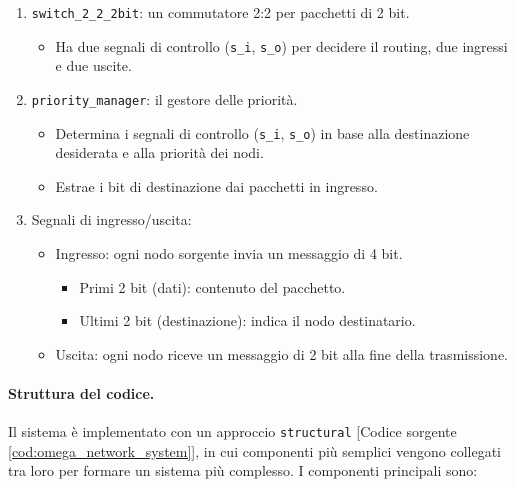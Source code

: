 \begin{enumerate}
\begin{itemize}
\begin{itemize}
        \end{itemize}
    \end{itemize}
    \item \texttt{switch\_2\_2\_2bit}: un commutatore 2:2 per pacchetti di 2 bit.
    \begin{itemize}
        \item Ha due segnali di controllo (\texttt{s\_i}, \texttt{s\_o}) per decidere il routing, due ingressi e due uscite.
    \end{itemize}
    \item \texttt{priority\_manager}: il gestore delle priorità.
    \begin{itemize}
        \item Determina i segnali di controllo (\texttt{s\_i}, \texttt{s\_o}) in base alla destinazione desiderata e alla priorità dei nodi.
        \item Estrae i bit di destinazione dai pacchetti in ingresso.
    \end{itemize}
    \item Segnali di ingresso/uscita:
    \begin{itemize}
        \item Ingresso: ogni nodo sorgente invia un messaggio di 4 bit.
        \begin{itemize}
            \item Primi 2 bit (dati): contenuto del pacchetto.
            \item Ultimi 2 bit (destinazione): indica il nodo destinatario.
        \end{itemize}
        \item Uscita: ogni nodo riceve un messaggio di 2 bit alla fine della trasmissione.
    \end{itemize}
\end{enumerate}

\paragraph{Struttura del codice.}
Il sistema è implementato con un approccio \texttt{structural} [Codice sorgente \ref{cod:omega_network_system}], in cui componenti più semplici vengono collegati tra loro per formare un sistema più complesso. I componenti principali sono:


